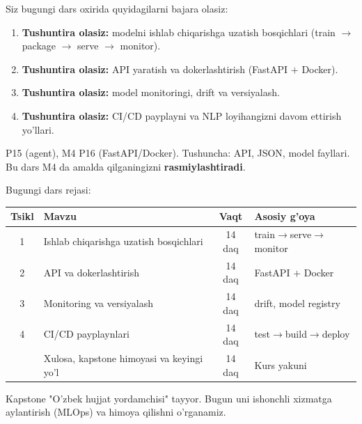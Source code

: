 \documentclass[aspectratio=169,11pt]{beamer}
\begin{document}
\begin{frame}{Siz bugungi dars oxirida quyidagilarni bajara olasiz:}
  \begin{enumerate}\setlength\itemsep{6pt}
    \item \textbf{Tushuntira olasiz:} modelni ishlab chiqarishga uzatish
          bosqichlari (train $\to$ package $\to$ serve $\to$ monitor).
    \item \textbf{Tushuntira olasiz:} API yaratish va dokerlashtirish (FastAPI $+$ Docker).
    \item \textbf{Tushuntira olasiz:} model monitoringi, drift va versiyalash.
    \item \textbf{Tushuntira olasiz:} CI/CD payplayni va NLP loyihangizni davom
          ettirish yo'llari.
  \end{enumerate}
  \vspace{4pt}
  \begin{tcolorbox}[defbox,title=Oldindan talab]
    \footnotesize
    P15 (agent), M4 P16 (FastAPI/Docker). Tushuncha: API, JSON, model fayllari.
    Bu dars M4 da amalda qilganingizni \textbf{rasmiylashtiradi}.
  \end{tcolorbox}
\end{frame}

\begin{frame}{Bugungi dars rejasi:}
  \begin{center}
  \small
  \begin{tabular}{c p{5.2cm} c p{3.0cm}}
    \toprule
    \textbf{Tsikl}& \textbf{Mavzu} & \textbf{Vaqt} & \textbf{Asosiy g'oya}\\
    \midrule
    1 & Ishlab chiqarishga uzatish bosqichlari & 14 daq & train$\to$serve$\to$monitor \\
    2 & API va dokerlashtirish & 14 daq & FastAPI $+$ Docker \\
    3 & Monitoring va versiyalash & 14 daq & drift, model registry \\
    4 & CI/CD payplaynlari & 14 daq & test$\to$build$\to$deploy \\
    \midrule
      & Xulosa, kapstone himoyasi va keyingi yo'l & 14 daq & Kurs yakuni \\
    \bottomrule
  \end{tabular}
  \end{center}
  \vspace{4pt}
  \begin{tcolorbox}[warnbox,title=Bu dars --- kurs yakuni]
    \footnotesize\sloppy
    Kapstone "O'zbek hujjat yordamchisi" tayyor. Bugun uni ishonchli xizmatga
    aylantirish (MLOps) va himoya qilishni o'rganamiz.
  \end{tcolorbox}
\end{frame}
\end{document}
